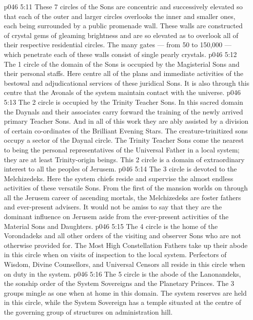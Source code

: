 \vs p046 5:11 These 7 circles of the Sons are concentric and successively elevated so that each of the outer and larger circles overlooks the inner and smaller ones, each being surrounded by a public promenade wall. These walls are constructed of crystal gems of gleaming brightness and are so elevated as to overlook all of their respective residential circles. The many gates --- from 50 to 150,000 --- which penetrate each of these walls consist of single pearly crystals.
\vs p046 5:12 The 1 circle of the domain of the Sons is occupied by the Magisterial Sons and their personal staffs. Here centre all of the plans and immediate activities of the bestowal and adjudicational services of these juridical Sons. It is also through this centre that the Avonals of the system maintain contact with the universe.
\vs p046 5:13 The 2 circle is occupied by the Trinity Teacher Sons. In this sacred domain the Daynals and their associates carry forward the training of the newly arrived primary Teacher Sons. And in all of this work they are ably assisted by a division of certain co\hyp{}ordinates of the Brilliant Evening Stars. The creature\hyp{}trinitized sons occupy a sector of the Daynal circle. The Trinity Teacher Sons come the nearest to being the personal representatives of the Universal Father in a local system; they are at least Trinity\hyp{}origin beings. This 2 circle is a domain of extraordinary interest to all the peoples of Jerusem.
\vs p046 5:14 The 3 circle is devoted to the Melchizedeks. Here the system chiefs reside and supervise the almost endless activities of these versatile Sons. From the first of the mansion worlds on through all the Jerusem career of ascending mortals, the Melchizedeks are foster fathers and ever\hyp{}present advisers. It would not be amiss to say that they are the dominant influence on Jerusem aside from the ever\hyp{}present activities of the Material Sons and Daughters.
\vs p046 5:15 The 4 circle is the home of the Vorondadeks and all other orders of the visiting and observer Sons who are not otherwise provided for. The Most High Constellation Fathers take up their abode in this circle when on visits of inspection to the local system. Perfectors of Wisdom, Divine Counsellors, and Universal Censors all reside in this circle when on duty in the system.
\vs p046 5:16 The 5 circle is the abode of the Lanonandeks, the sonship order of the System Sovereigns and the Planetary Princes. The 3 groups mingle as one when at home in this domain. The system reserves are held in this circle, while the System Sovereign has a temple situated at the centre of the governing group of structures on administration hill.
